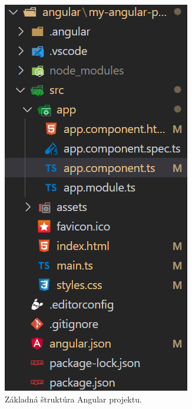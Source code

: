 \begin{figure}[H]
\begin{minipage}[t]{0.48\textwidth}
    \includegraphics[width=\linewidth]{img/angular-structure.png}
    \caption{Základná štruktúra Angular projektu.}
    \label{fig:angular-structure}

\end{minipage}
\end{figure}
